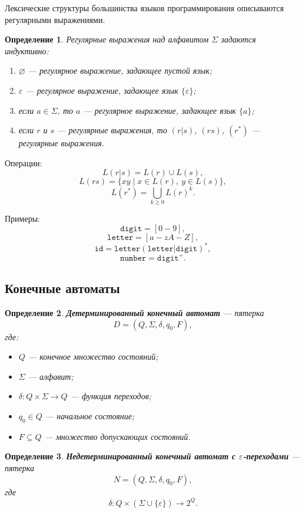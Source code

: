 \documentclass[12pt,a4paper]{article}
\newtheorem{definition}{Определение}
\begin{document}
Лексические структуры большинства языков программирования описываются регулярными выражениями.

\begin{definition}
Регулярные выражения над алфавитом $\Sigma$ задаются индуктивно:
\begin{enumerate}
    \item $\varnothing$ --- регулярное выражение, задающее пустой язык;
    \item $\varepsilon$ --- регулярное выражение, задающее язык $\{\varepsilon\}$;
    \item если $a \in \Sigma$, то $a$ --- регулярное выражение, задающее язык $\{a\}$;
    \item если $r$ и $s$ --- регулярные выражения, то $(r|s)$, $(rs)$, $(r^*)$ --- регулярные выражения.
\end{enumerate}
\end{definition}

Операции:
\[
L(r|s) = L(r) \cup L(s),
\]
\[
L(rs) = \{xy \mid x \in L(r),\ y \in L(s)\},
\]
\[
L(r^*) = \bigcup_{k \ge 0} L(r)^k.
\]

Примеры:
\[
\texttt{digit} = [0-9],
\]
\[
\texttt{letter} = [a-zA-Z],
\]
\[
\texttt{id} = \texttt{letter}(\texttt{letter}|\texttt{digit})^*,
\]
\[
\texttt{number} = \texttt{digit}^+.
\]

\subsection{Конечные автоматы}

\begin{definition}
\textbf{Детерминированный конечный автомат} --- пятерка
\[
D = (Q, \Sigma, \delta, q_0, F),
\]
где:
\begin{itemize}
    \item $Q$ --- конечное множество состояний;
    \item $\Sigma$ --- алфавит;
    \item $\delta : Q \times \Sigma \to Q$ --- функция переходов;
    \item $q_0 \in Q$ --- начальное состояние;
    \item $F \subseteq Q$ --- множество допускающих состояний.
\end{itemize}
\end{definition}

\begin{definition}
\textbf{Недетерминированный конечный автомат с $\varepsilon$-переходами} --- пятерка
\[
N = (Q, \Sigma, \delta, q_0, F),
\]
где
\[
\delta : Q \times (\Sigma \cup \{\varepsilon\}) \to 2^Q.
\]
\end{definition}
\end{document}
